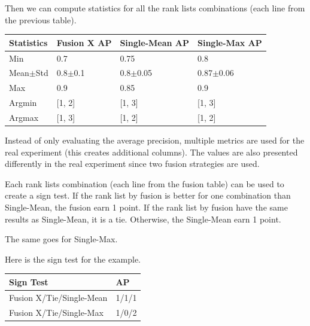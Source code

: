 \begin{example*}
  \vspace{0.5cm}

  Then we can compute statistics for all the rank lists combinations (each line from the previous table).

  \vspace{0.2cm}

  \begin{center}
    \begin{tabular}{l|l l l}
      \toprule
      Statistics        & Fusion X AP   & Single-Mean AP  & Single-Max AP\\
      \midrule
      Min               & 0.7         & 0.75            & 0.8 \\
      Mean$\pm$Std      & 0.8$\pm$0.1 & 0.8$\pm$0.05    & 0.87$\pm$0.06 \\
      Max               & 0.9         & 0.85            & 0.9 \\
      Argmin            & [1, 2]      & [1, 3]          & [1, 3] \\
      Argmax            & [1, 3]      & [1, 2]          & [1, 2] \\
      \bottomrule
    \end{tabular}
  \end{center}

  \vspace{0.2cm}

  Instead of only evaluating the average precision, multiple metrics are used for the real experiment (this creates additional columns).
  The values are also presented differently in the real experiment since two fusion strategies are used.

  \vspace{0.5cm}

  Each rank lists combination (each line from the fusion table) can be used to create a sign test.
  If the rank list by fusion is better for one combination than Single-Mean, the fusion earn 1 point.
  If the rank list by fusion have the same results as Single-Mean, it is a tie.
  Otherwise, the Single-Mean earn 1 point.

  The same goes for Single-Max.

  Here is the sign test for the example.

  \vspace{0.2cm}

  \begin{center}
    \begin{tabular}{l|l }
      \toprule
      Sign Test                & AP\\
      \midrule
      Fusion X/Tie/Single-Mean & 1/1/1 \\
      Fusion X/Tie/Single-Max  & 1/0/2 \\
      \bottomrule
    \end{tabular}
  \end{center}

\end{example*}


